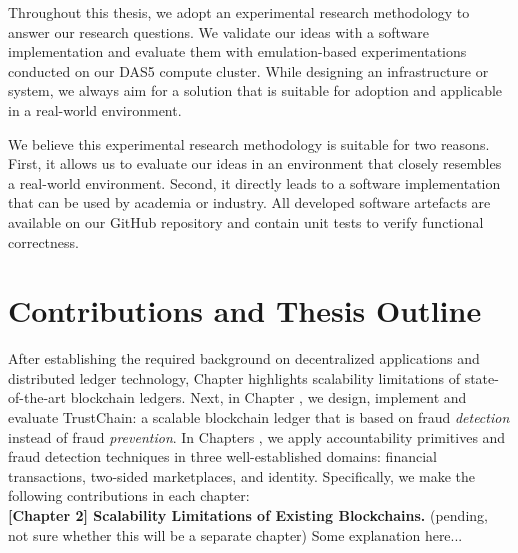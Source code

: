 
Throughout this thesis, we adopt an experimental research methodology to answer our research questions.
We validate our ideas with a software implementation and evaluate them with emulation-based experimentations conducted on our DAS5 compute cluster.
While designing an infrastructure or system, we always aim for a solution that is suitable for adoption and applicable in a real-world environment.


We believe this experimental research methodology is suitable for two reasons.
First, it allows us to evaluate our ideas in an environment that closely resembles a real-world environment.
Second, it directly leads to a software implementation that can be used by academia or industry.
All developed software artefacts are available on our GitHub repository and contain unit tests to verify functional correctness.



\section{Contributions and Thesis Outline}

After establishing the required background on decentralized applications and distributed ledger technology, Chapter  highlights scalability limitations of state-of-the-art blockchain ledgers.
Next, in Chapter , we design, implement and evaluate TrustChain: a scalable blockchain ledger that is based on fraud \emph{detection} instead of fraud \emph{prevention}.
In Chapters , we apply accountability primitives and fraud detection techniques in three well-established domains: financial transactions, two-sided marketplaces, and identity.
Specifically, we make the following contributions in each chapter:\\

\textbf{[Chapter 2] Scalability Limitations of Existing Blockchains.} (pending, not sure whether this will be a separate chapter)
Some explanation here...\\

